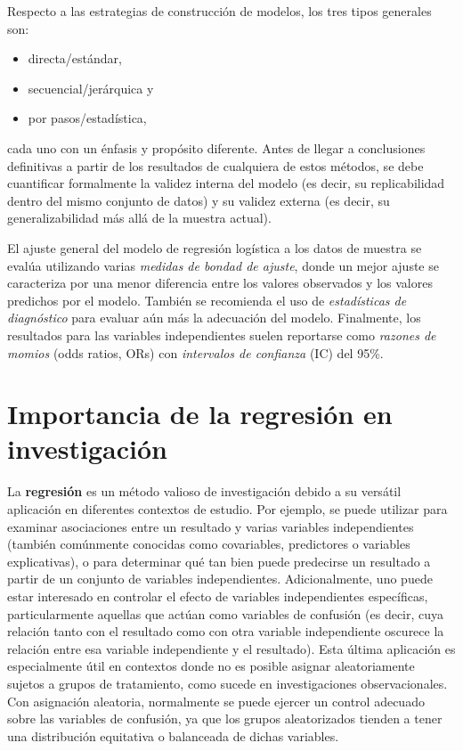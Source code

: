 \documentclass[12pt]{article}
\begin{document}
Respecto a las estrategias de construcci\'on de modelos, los tres tipos generales son: 
\begin{itemize}
\item directa/est\'andar, 
\item secuencial/jer\'arquica y 
\item por pasos/estad\'istica,
\end{itemize}
cada uno con un \'enfasis y prop\'osito diferente. Antes de llegar a conclusiones definitivas a partir de los resultados de cualquiera de estos m\'etodos, se debe cuantificar formalmente la validez interna del modelo (es decir, su replicabilidad dentro del mismo conjunto de datos) y su validez externa (es decir, su generalizabilidad m\'as all\'a de la muestra actual).

El ajuste general del modelo de regresi\'on log\'istica a los datos de muestra se eval\'ua utilizando varias \textit{medidas de bondad de ajuste}, donde un mejor ajuste se caracteriza por una menor diferencia entre los valores observados y los valores predichos por el modelo. Tambi\'en se recomienda el uso de \textit{estad\'isticas de diagn\'ostico} para evaluar a\'un m\'as la adecuaci\'on del modelo. Finalmente, los resultados para las variables independientes suelen reportarse como \textit{razones de momios} (odds ratios, ORs) con \textit{intervalos de confianza} (IC) del 95\%.

\section{Importancia de la regresi\'on en investigaci\'on}

La \textbf{regresi\'on} es un m\'etodo valioso de investigaci\'on debido a su vers\'atil aplicaci\'on en diferentes contextos de estudio. Por ejemplo, se puede utilizar para examinar asociaciones entre un resultado y varias variables independientes (tambi\'en com\'unmente conocidas como covariables, predictores o variables explicativas)\cite{darlington1990}, o para determinar qu\'e tan bien puede predecirse un resultado a partir de un conjunto de variables independientes\cite{darlington1990,tabachnick2007}. Adicionalmente, uno puede estar interesado en controlar el efecto de variables independientes espec\'ificas, particularmente aquellas que act\'uan como variables de confusi\'on (es decir, cuya relaci\'on tanto con el resultado como con otra variable independiente oscurece la relaci\'on entre esa variable independiente y el resultado)\cite{darlington1990,hosmer2000}. Esta \'ultima aplicaci\'on es especialmente \'util en contextos donde no es posible asignar aleatoriamente sujetos a grupos de tratamiento, como sucede en investigaciones observacionales. Con asignaci\'on aleatoria, normalmente se puede ejercer un control adecuado sobre las variables de confusi\'on, ya que los grupos aleatorizados tienden a tener una distribuci\'on equitativa o balanceada de dichas variables\cite{campbell1963}.
\end{document}

